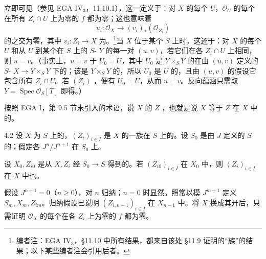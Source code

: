 立即可见（参见 EGA IV$_3$，11.10.1），这一定义于：对 $X$ 的每个 $U$，$\mathcal O_U$ 的每个在所有 $Z_i\cap U$ 上为零的 $f$ 都为零；这也意味着
\[u_i:\mathcal O_X\longrightarrow(v_i)_*(\mathcal O_{Z_i})\]
的之交为零，其中 $v_i:Z_i\to X$ 为。\footnote{编者注：EGA IV$_3$，\S11.10 中所有结果，都来自该处 \S11.9 证明的“族”的结果；以下某些编者注会引用后者。}当 $X$ 位于某个 $S$ 上时，这还于：对 $X$ 的每个 $U$ 和从 $U$ 到某个在 $S$ 上的 $S$- $Y$ 的每一对 $(u,v)$，若它们在各 $Z_i\cap U$ 上相同，则 $u=v$。（事实上，$u=v$ 于 $U_0=U$，其中 $U_0$ 是 $Y\times_S Y$ 的在由 $(u,v)$ 定义的 $S$- $X\to Y\times_S Y$ 下的；该是 $Y\times_S Y$ 的，所以 $U_0$ 是 $U$ 的，且由 $(u,v)$ 的假设它包含所有 $Z_i\cap U$。若 $(Z_i)$ ，便有 $U_0=U$，从而 $u=v$。反向蕴涵只需取 $Y=\operatorname{Spec}\mathcal O_S[T]$ 即得。）

按照 EGA I，第 9.5 节末引入的术语，说 $X$ 的 $Z$ ，也就是说 $X$ 等于 $Z$ 在 $X$ 中的。
\begin{SGAresult}{}{4.2}
设 $X$ 为 $S$ 上的，$(Z_i)_{i\in I}$ 是 $X$ 的一族在 $S$ 上的。设 $S_0$ 是由 $J$ 定义的 $S$ 的；假定各 $J^n/J^{n+1}$ 在 $S_0$ 上。

设 $X_0,Z_{i0}$ 是从 $X,Z_i$ 经 $S_0\to S$ 得到的。若 $(Z_{i0})_{i\in I}$ 在 $X_0$ 中，则 $(Z_i)_{i\in I}$ 在 $X$ 中也。
\end{SGAresult}
假设 $J^{n+1}=0$（$n\geq0$），对 $n$ 归纳；$n=0$ 时显然。照常以模 $J^{m+1}$ 定义 $S_m,X_m,Z_{im}$。归纳假设已说明 $(Z_{i,n-1})_{i\in I}$ 在 $X_{n-1}$ 中。将 $X$ 换成其开后，只需证明 $\mathcal O_X$ 的每个在各 $Z_i$ 上为零的 $f$ 都为零。

